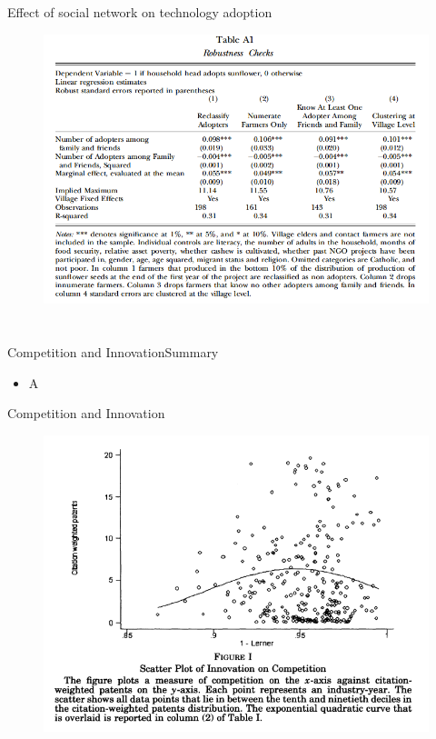 \documentclass{beamer}
\begin{document}
\begin{frame}{Effect of social network on technology adoption}{}
\begin{figure}[h]
\begin{centering}
  \includegraphics[width=\textwidth]{01tablea1}
   \label{fig:01tablea1}
\end{centering}
\end{figure}
\end{frame}


\section{\cite{Aghion2005}}
\begin{frame}{Competition and Innovation}{Summary}
\begin{itemize}
\item{A}
\end{itemize}
\end{frame}

\begin{frame}{Competition and Innovation}{}
\begin{figure}[h]
\begin{centering}
  \includegraphics[width=\textwidth]{0201}
   \label{fig:0201}
\end{centering}
\end{figure}
\end{frame}
\end{document}
